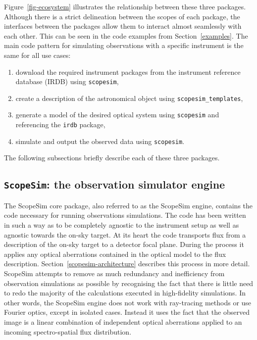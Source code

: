 Figure~\ref{fig-ecosystem} illustrates the relationship between these three packages.
Although there is a strict delineation between the scopes of each package, the interfaces between the packages allow them to interact almost seamlessly with each other.
This can be seen in the code examples from Section~\ref{examples}.
The main code pattern for simulating observations with a specific instrument is the same for all use cases:

\begin{enumerate}
\item download the required instrument packages from the instrument reference database (IRDB) using \lstinline{scopesim},

\item create a description of the astronomical object using \lstinline{scopesim_templates},

\item generate a model of the desired optical system using \lstinline{scopesim} and referencing the \lstinline{irdb} package,

\item simulate and output the observed data using \lstinline{scopesim}.
\end{enumerate}

The following subsections briefly describe each of these three packages.

\subsection{\lstinline{ScopeSim}: the observation simulator engine}
\label{scopesim-the-observation-simulator-engine}

The ScopeSim core package, also referred to as the ScopeSim engine, contains the code necessary for running observations simulations.
The code has been written in such a way as to be completely agnostic to the instrument setup as well as agnostic towards the on-sky target.
At its heart the code transports flux from a description of the on-sky target to a detector focal plane.
During the process it applies any optical aberrations contained in the optical model to the flux description.
Section~\ref{scopesim-architecture} describes this process in more detail.
ScopeSim attempts to remove as much redundancy and inefficiency from observation simulations as possible by recognising the fact that there is little need to redo the majority of the calculations executed in high-fidelity simulations.
In other words, the ScopeSim engine does not work with ray-tracing methods or use Fourier optics, except in isolated cases.
Instead it uses the fact that the observed image is a linear combination of independent optical aberrations applied to an incoming spectro-spatial flux distribution.

